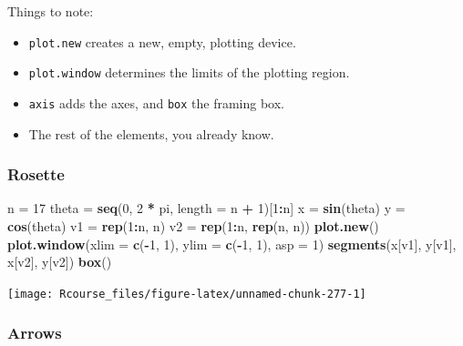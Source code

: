 \documentclass[]{book}
\newenvironment{Shaded}{\begin{snugshade}}{\end{snugshade}}
\newcommand{\KeywordTok}[1]{\textcolor[rgb]{0.13,0.29,0.53}{\textbf{#1}}}
\newcommand{\DataTypeTok}[1]{\textcolor[rgb]{0.13,0.29,0.53}{#1}}
\newcommand{\DecValTok}[1]{\textcolor[rgb]{0.00,0.00,0.81}{#1}}
\newcommand{\StringTok}[1]{\textcolor[rgb]{0.31,0.60,0.02}{#1}}
\newcommand{\OperatorTok}[1]{\textcolor[rgb]{0.81,0.36,0.00}{\textbf{#1}}}
\newcommand{\NormalTok}[1]{#1}
\providecommand{\tightlist}{%
  \setlength{\itemsep}{0pt}\setlength{\parskip}{0pt}}
\theoremstyle{definition}
\theoremstyle{definition}
\theoremstyle{definition}
\theoremstyle{remark}
\begin{document}
Things to note:

\begin{itemize}
\tightlist
\item
  \texttt{plot.new} creates a new, empty, plotting device.
\item
  \texttt{plot.window} determines the limits of the plotting region.
\item
  \texttt{axis} adds the axes, and \texttt{box} the framing box.
\item
  The rest of the elements, you already know.
\end{itemize}

\subsubsection{Rosette}\label{rosette}

\begin{Shaded}
\begin{Highlighting}[]
\NormalTok{n =}\StringTok{ }\DecValTok{17}
\NormalTok{theta =}\StringTok{ }\KeywordTok{seq}\NormalTok{(}\DecValTok{0}\NormalTok{, }\DecValTok{2} \OperatorTok{*}\StringTok{ }\NormalTok{pi, }\DataTypeTok{length =}\NormalTok{ n }\OperatorTok{+}\StringTok{ }\DecValTok{1}\NormalTok{)[}\DecValTok{1}\OperatorTok{:}\NormalTok{n]}
\NormalTok{x =}\StringTok{ }\KeywordTok{sin}\NormalTok{(theta)}
\NormalTok{y =}\StringTok{ }\KeywordTok{cos}\NormalTok{(theta)}
\NormalTok{v1 =}\StringTok{ }\KeywordTok{rep}\NormalTok{(}\DecValTok{1}\OperatorTok{:}\NormalTok{n, n)}
\NormalTok{v2 =}\StringTok{ }\KeywordTok{rep}\NormalTok{(}\DecValTok{1}\OperatorTok{:}\NormalTok{n, }\KeywordTok{rep}\NormalTok{(n, n))}
\KeywordTok{plot.new}\NormalTok{()}
\KeywordTok{plot.window}\NormalTok{(}\DataTypeTok{xlim =} \KeywordTok{c}\NormalTok{(}\OperatorTok{-}\DecValTok{1}\NormalTok{, }\DecValTok{1}\NormalTok{), }\DataTypeTok{ylim =} \KeywordTok{c}\NormalTok{(}\OperatorTok{-}\DecValTok{1}\NormalTok{, }\DecValTok{1}\NormalTok{), }\DataTypeTok{asp =} \DecValTok{1}\NormalTok{)}
\KeywordTok{segments}\NormalTok{(x[v1], y[v1], x[v2], y[v2])}
\KeywordTok{box}\NormalTok{()}
\end{Highlighting}
\end{Shaded}

\texttt{[image: Rcourse\_files/figure-latex/unnamed-chunk-277-1]}

\subsubsection{Arrows}\label{arrows}
\end{document}
